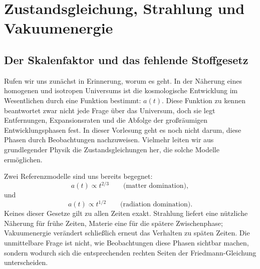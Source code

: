 \chapter{Zustandsgleichung, Strahlung und Vakuumenergie}


\section{Der Skalenfaktor und das fehlende Stoffgesetz}

Rufen wir uns zunächst in Erinnerung, worum es geht. In der Näherung eines homogenen und isotropen Universums ist die kosmologische Entwicklung im Wesentlichen durch eine Funktion bestimmt: \(a(t)\). Diese Funktion zu kennen beantwortet zwar nicht jede Frage über das Universum, doch sie legt Entfernungen, Expansionsraten und die Abfolge der großräumigen Entwicklungsphasen fest. In dieser Vorlesung geht es noch nicht darum, diese Phasen durch Beobachtungen nachzuweisen. Vielmehr leiten wir aus grundlegender Physik die Zustandsgleichungen her, die solche Modelle ermöglichen.

Zwei Referenzmodelle sind uns bereits begegnet:
\begin{equation}
a(t)\propto t^{2/3}
\qquad\text{(matter domination)},
\end{equation}
und
\begin{equation}
a(t)\propto t^{1/2}
\qquad\text{(radiation domination)}.
\end{equation}
Keines dieser Gesetze gilt zu allen Zeiten exakt. Strahlung liefert eine nützliche Näherung für frühe Zeiten, Materie eine für die spätere Zwischenphase; Vakuumenergie verändert schließlich erneut das Verhalten zu späten Zeiten. Die unmittelbare Frage ist nicht, wie Beobachtungen diese Phasen sichtbar machen, sondern wodurch sich die entsprechenden rechten Seiten der Friedmann-Gleichung unterscheiden.


